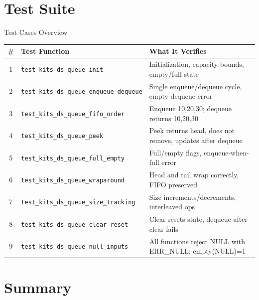 \documentclass[aspectratio=169, 10pt]{beamer}
\begin{document}
\section{Test Suite}

\begin{frame}{Test Cases Overview}
\begin{table}
\centering
\small
\begin{tabular}{@{}clp{7cm}@{}}
\toprule
\textbf{\#} & \textbf{Test Function} & \textbf{What It Verifies} \\
\midrule
1 & \texttt{test\_kits\_ds\_queue\_init}
  & Initialization, capacity bounds, empty/full state \\
2 & \texttt{test\_kits\_ds\_queue\_enqueue\_dequeue}
  & Single enqueue/dequeue cycle, empty-dequeue error \\
3 & \texttt{test\_kits\_ds\_queue\_fifo\_order}
  & Enqueue 10,20,30; dequeue returns 10,20,30 \\
4 & \texttt{test\_kits\_ds\_queue\_peek}
  & Peek returns head, does not remove, updates after dequeue \\
5 & \texttt{test\_kits\_ds\_queue\_full\_empty}
  & Full/empty flags, enqueue-when-full error \\
6 & \texttt{test\_kits\_ds\_queue\_wraparound}
  & Head and tail wrap correctly, FIFO preserved \\
7 & \texttt{test\_kits\_ds\_queue\_size\_tracking}
  & Size increments/decrements, interleaved ops \\
8 & \texttt{test\_kits\_ds\_queue\_clear\_reset}
  & Clear resets state, dequeue after clear fails \\
9 & \texttt{test\_kits\_ds\_queue\_null\_inputs}
  & All functions reject NULL with ERR\_NULL; empty(NULL)=1 \\
\bottomrule
\end{tabular}
\end{table}
\end{frame}

\section{Summary}
\end{document}
